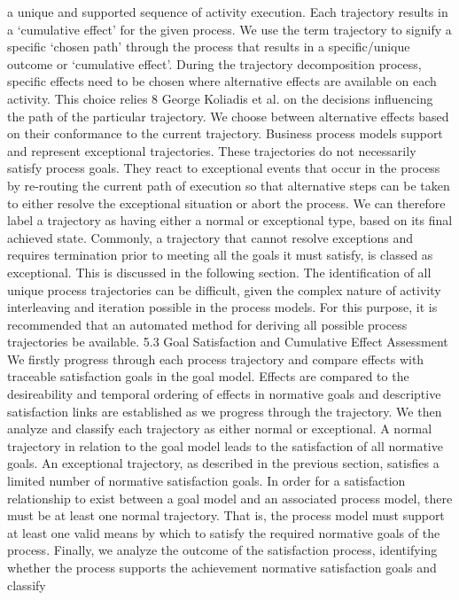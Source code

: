 a unique and supported sequence of activity execution. Each trajectory results
in a ‘cumulative effect’ for the given process. We use the term trajectory to signify a specific ‘chosen path’ through the process that results in a specific/unique
outcome or ‘cumulative effect’.
During the trajectory decomposition process, specific effects need to be chosen where alternative effects are available on each activity. This choice relies
8 George Koliadis et al.
on the decisions influencing the path of the particular trajectory. We choose
between alternative effects based on their conformance to the current trajectory.
Business process models support and represent exceptional trajectories. These
trajectories do not necessarily satisfy process goals. They react to exceptional
events that occur in the process by re-routing the current path of execution so
that alternative steps can be taken to either resolve the exceptional situation or
abort the process. We can therefore label a trajectory as having either a normal
or exceptional type, based on its final achieved state. Commonly, a trajectory
that cannot resolve exceptions and requires termination prior to meeting all the
goals it must satisfy, is classed as exceptional. This is discussed in the following
section.
The identification of all unique process trajectories can be difficult, given
the complex nature of activity interleaving and iteration possible in the process
models. For this purpose, it is recommended that an automated method for
deriving all possible process trajectories be available.
5.3 Goal Satisfaction and Cumulative Effect Assessment
We firstly progress through each process trajectory and compare effects with
traceable satisfaction goals in the goal model. Effects are compared to the desireability and temporal ordering of effects in normative goals and descriptive
satisfaction links are established as we progress through the trajectory.
We then analyze and classify each trajectory as either normal or exceptional.
A normal trajectory in relation to the goal model leads to the satisfaction of all
normative goals. An exceptional trajectory, as described in the previous section,
satisfies a limited number of normative satisfaction goals.
In order for a satisfaction relationship to exist between a goal model and an
associated process model, there must be at least one normal trajectory. That is,
the process model must support at least one valid means by which to satisfy the
required normative goals of the process.
Finally, we analyze the outcome of the satisfaction process, identifying whether
the process supports the achievement normative satisfaction goals and classify
